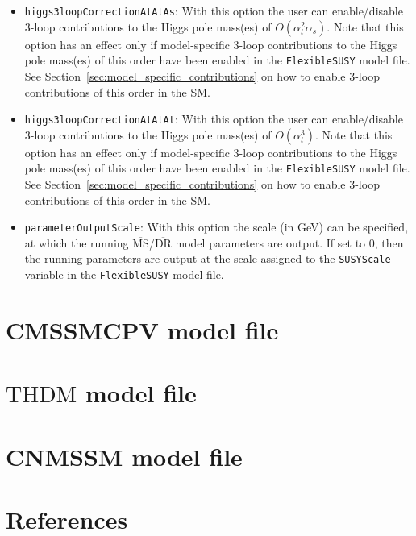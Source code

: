 \documentclass[final,3p,11pt,pdflatex]{elsarticle}
\makeatletter
\newcommand{\fs}{\texttt{FlexibleSUSY}\@\xspace}
\newcommand{\code}[1]{\lstinline|#1|}  %
\newcommand{\ol}[1]{\overline{#1}}
\newcommand{\MSbar}{\ensuremath{\ol{\text{MS}}}\xspace}
\newcommand{\DRbar}{\ensuremath{\ol{\text{DR}}}\xspace}
\newcommand{\THDM}{\ensuremath{\text{THDM}}\xspace}
\newcommand{\secref}[1]{Section~\ref{#1}}
\def\at{\alpha_t}
\def\as{\alpha_s}
\makeatother
\begin{document}
\begin{itemize}
\item[\texttt{FlexibleSUSY[28]},] \texttt{higgs3loopCorrectionAtAtAs}:
  With this option the user can enable/disable 3-loop contributions to
  the Higgs pole mass(es) of $O(\at^2\as)$.  Note that this option
  has an effect only if model-specific 3-loop contributions to the
  Higgs pole mass(es) of this order have been enabled in the \fs model file.
  See \secref{sec:model_specific_contributions} on how to enable
  3-loop contributions of this order in the SM\@.

\item[\texttt{FlexibleSUSY[29]},] \texttt{higgs3loopCorrectionAtAtAt}:
  With this option the user can enable/disable 3-loop contributions to
  the Higgs pole mass(es) of $O(\at^3)$.  Note that this option has
  an effect only if model-specific 3-loop contributions to the Higgs
  pole mass(es) of this order have been enabled in the \fs model file.  See
  \secref{sec:model_specific_contributions} on how to enable 3-loop
  contributions of this order in the SM\@.

\item[\texttt{MODSEL[12]},] \texttt{parameterOutputScale}: With this
  option the scale (in GeV) can be specified, at which the running
  \MSbar/\DRbar model parameters are output.  If set to $0$, then the
  running parameters are output at the scale assigned to the
  \code{SUSYScale} variable in the \fs model file.
\end{itemize}

\section{CMSSMCPV model file}
\label{app:CMSSMCPV}


\section{\THDM model file}
\label{app:THDMIIMSSMBC}


\section{CNMSSM model file}
\label{app:CNMSSM}


\clearpage

\section*{References}



\end{document}

